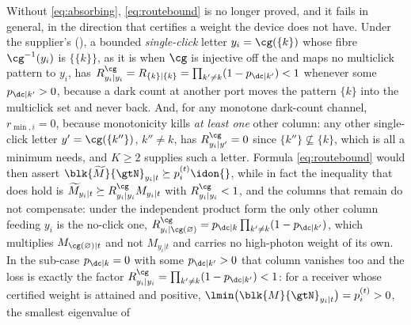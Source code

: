 
\begin{remark}\label{rem:absorbneeded}
Without \eqref{eq:absorbing}, \eqref{eq:routebound} is no longer proved, and
it fails in general, in the direction that certifies a weight the device does
not have. Under the supplier's 
(), a bounded
\emph{single-click} letter $y_i=\cg(\{k\})$ whose fibre $\cg^{-1}(y_i)$ is
$\{\{k\}\}$, as it is when $\cg$ is injective off the 
and maps no multiclick pattern to $y_i$, has $R^{\cg}_{y_i|y_i}=R_{\{k\}|\{k\}}
=\prod_{k'\ne k}(1-p_{\dc|k'})<1$
whenever some $p_{\dc|k'}>0$, because a dark count at another port moves the
pattern $\{k\}$ into the multiclick set and never back. And, for any
monotone dark-count channel,
$r_{\min,i}=0$, because monotonicity kills \emph{at least one} other column:
any other single-click letter $y'=\cg(\{k''\})$, $k''\ne k$, has
$R^{\cg}_{y_i|y'}=0$ since $\{k''\}\not\subseteq\{k\}$, which is all a minimum
needs, and $K\ge2$ supplies such a letter. Formula \eqref{eq:routebound} would
then assert $\blk{\widetilde M}{\gtN}_{y_i|t}\succeq p^{(t)}_i\idon{}$, while
in fact the inequality that does hold is
$\widetilde M_{y_i|t}\succeq R^{\cg}_{y_i|y_i}M_{y_i|t}$ with
$R^{\cg}_{y_i|y_i}<1$, and the columns that remain do not compensate: under
the independent product form the only other column
feeding $y_i$ is the no-click one,
$R^{\cg}_{y_i|\cg(\varnothing)}=p_{\dc|k}\prod_{k'\ne k}(1-p_{\dc|k'})$, which
multiplies $M_{\cg(\varnothing)|t}$ and not $M_{y_i|t}$ and carries no
high-photon weight of its own. In the sub-case $p_{\dc|k}=0$ with some
$p_{\dc|k'}>0$ that column vanishes too and the loss is exactly the factor
$R^{\cg}_{y_i|y_i}=\prod_{k'\ne k}(1-p_{\dc|k'})<1$: for a receiver whose
certified weight is attained and positive,
$\lmin\big(\blk{M}{\gtN}_{y_i|t}\big)=p^{(t)}_i>0$, the smallest eigenvalue of

\end{remark}
